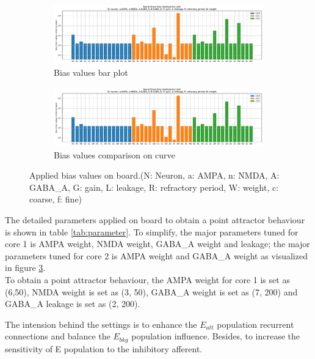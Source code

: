 \begin{figure}
	\begin{subfigure}{\textwidth}
		\centering
		\includegraphics[page=1, width=\columnwidth]{./img/implementation/bias_readouts.pdf}
		\caption{Bias values bar plot}
		\label{fig:biasOnBoard_bar}
	\end{subfigure}
	\begin{subfigure}{\textwidth}
		\centering
		\includegraphics[page=2, width=\columnwidth]{./img/implementation/bias_readouts.pdf}
		\caption{Bias values comparison on curve}
		\label{fig:biasOnBoard_online}
	\end{subfigure}
	\caption{Applied bias values on board.(N: Neuron, a: AMPA, n: NMDA, A: GABA\_A, G:  gain, L: leakage, R: refractory period, W: weight, c: coarse, f: fine)}
	\label{fig:biasOnBoard}
\end{figure}

The detailed parameters applied on board to obtain a point attractor behaviour is shown in table \ref{tab:parameter}. To simplify, the major parameters tuned for core 1 is AMPA weight, NMDA weight, GABA\_A weight and leakage; the major parameters tuned for core 2 is AMPA weight and GABA\_A weight as visualized in figure \ref{fig:biasOnBoard}.\\

To obtain a point attractor behaviour, the AMPA weight for core 1 is set as (6,50), NMDA weight is set as (3, 50), GABA\_A weight is set as (7, 200) and GABA\_A leakage is set as (2, 200).

The intension behind the settings is to enhance the $E_{att}$ population recurrent connections and balance the $E_{bkg}$ population influence.
Besides, to increase the sensitivity of E population to the inhibitory afferent.\\

